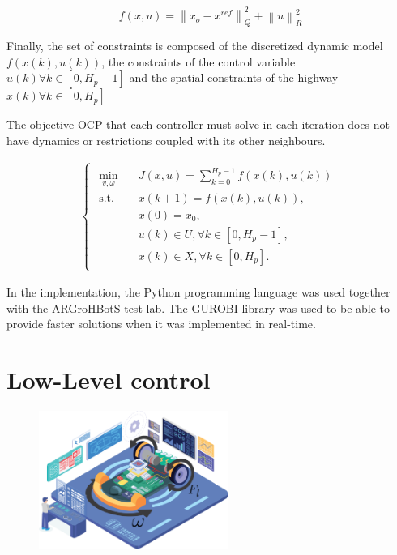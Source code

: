 \begin{equation}
    f(x,u)=\left\| x_o -x^{ref} \right\|^2_Q + \left\| u \right\|^2_R
\end{equation}

Finally, the set of constraints is composed of the discretized dynamic model $f(x(k),u(k))$, the constraints of the control variable $u(k) \forall k \in [0, H_p- 1]$ and the spatial constraints of the highway $x(k) \forall k \in [0, H_p]$

The objective OCP that each controller must solve in each iteration does not have dynamics or restrictions coupled with its other neighbours.

\begin{align}
    \left\{\begin{matrix} 
\begin{aligned} 
\min_{v,\omega} \quad & J\left ( x,u \right ) = \sum_{k=0}^{H_p-1} f(x(k),u(k))\\
\textrm{s.t.} \quad & x(k+1) = f(x(k),u(k)),  \\
  &   x(0) = x_0, \\
 & u(k) \in U, \forall k \in [0, H_p-1], \\
 & x(k) \in X, \forall k \in [0, H_p].
\end{aligned}
\end{matrix}\right.
\end{align}

In the implementation, the Python programming language was used together with the ARGroHBotS \cite{agrobots} test lab. The GUROBI library was used to be able to provide faster solutions when it was implemented in real-time.




\section{Low-Level control}

\begin{figure}[H]
\centering
    \includegraphics[width=0.55\textwidth]{Kap3/PID_model.png}
\end{figure}



